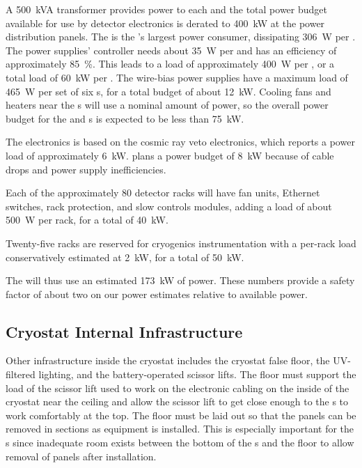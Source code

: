 A \SI{500}{kVA} transformer provides power to each and the total power budget available for use by detector electronics is derated to \SI{400}{kW} at the power distribution panels.  
The  is the 's largest power consumer,  dissipating \SI{306}{W} per .  
The  power supplies' controller needs about \SI{35}{W} per  and has an efficiency of approximately \SI{85}{\%}. 
This leads to a load of  approximately  \SI{400}{W}  per , or a total load of  \SI{60}{kW} per .  
The  wire-bias power supplies have a maximum load of  \SI{465}{W} per set of six s, for a total budget of about   \SI{12}{kW}.   
Cooling fans and heaters near the \fdth{}s will use a nominal amount of power, so the overall power budget for the  and  s is expected to be less than \SI{75}{kW}.


The  electronics is based on the  cosmic ray veto electronics, which reports a power load of approximately  \SI{6}{kW}.   plans a power budget of  \SI{8}{kW} because of cable drops and  power supply inefficiencies.  

Each of the approximately 80 detector racks will have fan units, Ethernet switches, rack protection, and slow controls modules, adding a load of about \SI{500}{W} per rack, for a total of \SI{40}{kW}.

Twenty-five racks are reserved for cryogenics instrumentation with a per-rack load conservatively estimated at \SI{2}{kW}, for a total of \SI{50}{kW}. 

The  will thus use  an estimated \SI{173}{kW} of power.   These numbers provide a safety factor of about two on our power estimates relative to available power.


\subsection{Cryostat Internal Infrastructure}
\label{sec:fdsp-tc-infr-cryo-int}



Other infrastructure inside the cryostat includes the cryostat false floor, the UV-filtered lighting, and the battery-operated scissor lifts. 
The floor must support the load of the scissor lift used to work on the electronic cabling on the inside of the cryostat near the ceiling and allow the scissor lift to get close enough to the s to work comfortably at the top. 
The floor  must be laid out so that the panels can be removed in sections as equipment is installed. 
This is especially important for the s since inadequate room exists between the bottom of the s and the floor to allow removal of panels after installation. 


